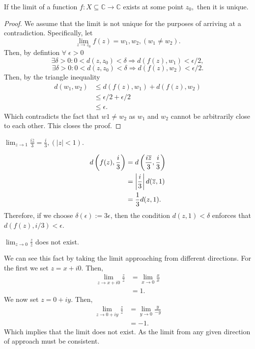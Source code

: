 \documentclass[12pt]{book}
\begin{document}
\begin{thm}
    If the limit of a function $f: X \subseteq \mathbb{C} \rightarrow \mathbb{C}$ exists at some point $z_0,$ then it is unique.
\end{thm}
\begin{proof}
    We assume that the limit is not unique for the purposes of arriving at a contradiction. Specifically, let 
    $$
        \lim_{z \rightarrow z_0} f(z) = w_1, w_2, (w_1 \neq w_2).
    $$
    Then, by defintion $\forall\; \epsilon > 0$
        $$
            \exists \delta > 0: 0 < d(z, z_0) < \delta \Rightarrow d(f(z), w_1) < \epsilon / 2,
        $$
        $$
            \exists \delta > 0: 0 < d(z, z_0) < \delta \Rightarrow d(f(z), w_2) < \epsilon / 2.
        $$
    Then, by the triangle inequality
        \begin{align*}
            d(w_1, w_2)
                &\leq 
                    d(f(z), w_1) + d(f(z), w_2) \\
                &\leq
                    \epsilon / 2 + \epsilon / 2 \\
                &\leq
                    \epsilon.
        \end{align*}
    Which contradicts the fact that $w1 \neq w_2$ as $w_1$ and $w_2$ cannot be arbitrarily close to each other. This closes the proof.
\end{proof}

\begin{exmp}
    $\lim_{z \rightarrow 1} \frac{i\overline{z}}{3} = \frac{i}{3}, (|z| < 1).$
\end{exmp}
\begin{align*}
    d\left(f(z), \frac{i}{3}\right)
        &=
            d\left(\frac{i\overline{z}}{3}, \frac{i}{3}\right) \\
        &=
            \left\lvert \frac{i}{3} \right\rvert d(\overline{z}, 1) \\
        &=
            \frac{1}{3}d(z, 1).
\end{align*}
Therefore, if we choose $\delta(\epsilon) := 3\epsilon$, then the condition $d(z, 1) < \delta$ enforces that $d(f(z), i / 3) < \epsilon.$  

\begin{exmp}
    $\lim_{z \rightarrow 0}\frac{z}{\overline{z}}$ does not exist.
\end{exmp}
We can see this fact by taking the limit approaching from different directions. For the first we set $z = x + i0.$ Then,
\begin{align*}
    \lim_{z \rightarrow x + i0} \frac{z}{\overline{z}}
        &= 
            \lim_{x \rightarrow 0} \frac{x}{x} \\
        &= 
            1.
\end{align*}
We now set $z = 0 + iy.$ Then,
\begin{align*}
    \lim_{z \rightarrow 0 + iy} \frac{z}{\overline{z}}
        &= 
            \lim_{y \rightarrow 0} \frac{y}{-y} \\
        &= 
            -1.
\end{align*}
Which implies that the limit does not exist. As the limit from any given direction of approach must be consistent.
\end{document}
